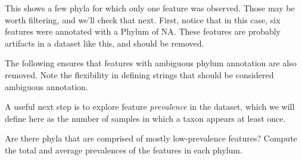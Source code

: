 This shows a few phyla for which only one feature was observed.
Those may be worth filtering, and we'll check that next.
First, notice that in this case, six features were annotated with a Phylum of NA.
These features are probably artifacts in a dataset like this,
and should be removed.

The following ensures that features with ambiguous phylum annotation are also removed.
Note the flexibility in defining strings that should be considered ambiguous annotation.

\begin{knitrout}
\color{fgcolor}
\end{knitrout}

A useful next step is to explore feature \emph{prevalence} in the dataset,
which we will define here as
the number of samples in which a taxon appears at least once.

\begin{knitrout}
\color{fgcolor}\begin{kframe}
\begin{alltt}
 \hlkwb{=} \hlstd{(} \hlstd{=} 
                \hlstd{=} \hlstd{(}  \hlstd{=} \hlstd{,}  \hlstd{=} \hlstd{),}
                \hlstd{=} \hlstd{(}\hlstd{)\{} \hlopt{>} \hlstd{)\})}
 \hlkwb{=} \hlstd{(} 
                     \hlstd{=} 
\end{alltt}
\end{kframe}
\end{knitrout}


Are there phyla that are comprised of mostly low-prevalence features?
Compute the total and average prevalences of the features in each phylum.

